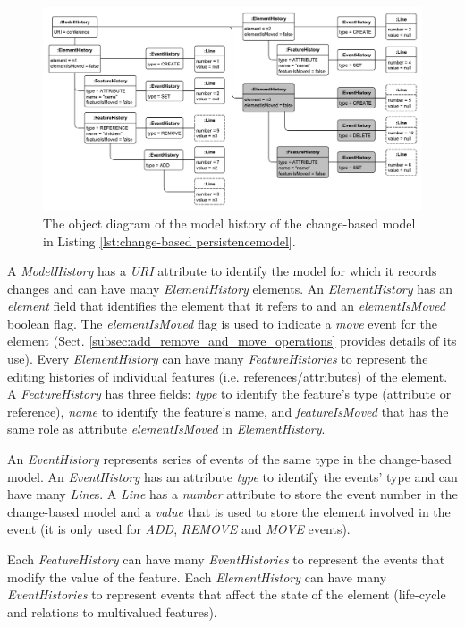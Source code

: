 \documentclass[12pt, a4paper]{report} \usepackage[titletoc]{appendix}
\begin{document}
\begin{figure}[ht]
	\centering
	\includegraphics[width=\linewidth]{history_structure}
	\caption{The object diagram of the model history of the change-based model in Listing \ref{lst:change-based persistencemodel}.}
	\label{fig:history_structure}
\end{figure}

A \emph{ModelHistory} has a \emph{URI} attribute to identify the model for which it records changes and can have many \emph{ElementHistory} elements. An \emph{ElementHistory} has an \emph{element} field that identifies the element that it refers to and an \emph{elementIsMoved} boolean flag. The  \emph{elementIsMoved} flag is used to indicate a \emph{move} event for the element (Sect. \ref{subsec:add_remove_and_move_operations} provides details of its use). Every \emph{ElementHistory} can have many \emph{FeatureHistories} to represent the editing histories of individual features (i.e. references/attributes) of the element.  A \emph{FeatureHistory} has three fields: \emph{type} to identify the feature's type (attribute or reference), \emph{name} to identify the feature's name, and \emph{featureIsMoved} that has the same role as attribute \emph{elementIsMoved} in \emph{ElementHistory}.

An \emph{EventHistory} represents series of events of the same type in the change-based model. An \emph{EventHistory} has an attribute \emph{type} to identify the events' type and can have many \emph{Line}s. A \emph{Line} has a \emph{number} attribute to store the event number in the change-based model and a \emph{value} that is used to store the element involved in the event (it is only used for \emph{ADD}, \emph{REMOVE} and \emph{MOVE} events).

Each \emph{FeatureHistory} can have many \emph{EventHistories} to represent the events that modify the value of the feature. Each \emph{ElementHistory} can have many \emph{EventHistories} to represent events that affect the state of the element (life-cycle and relations to multivalued features).
\end{document}
